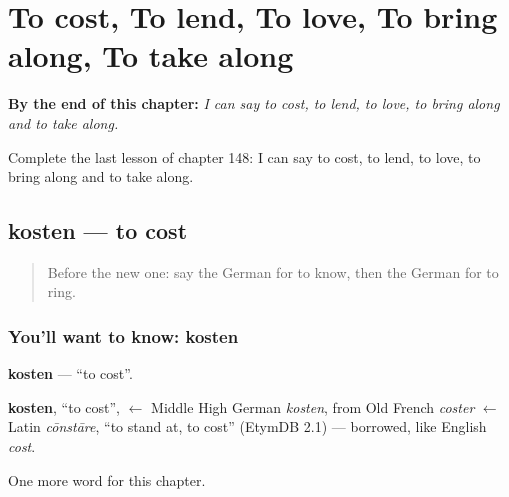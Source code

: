 
\chapter{To cost, To lend, To love, To bring along, To take along}
\label{ch:ge-to-cost-to-lend-to-love-to-bring-along-to-take-along}

\begin{chapteropening}
\textbf{By the end of this chapter:} \emph{I can say to cost, to lend, to love, to bring along and to take along.}

Complete the last lesson of chapter 148: I can say to cost, to lend, to love, to bring along and to take along.
\end{chapteropening}

\section[kosten]{kosten — to cost}

\label{lesson:GE-C148-kosten}



\begin{quote}
Before the new one: say the German for to know, then the German for to ring.
\end{quote}

\subsection*{You'll want to know: kosten}
\textbf{kosten} — \textquotedblleft{}to cost\textquotedblright{}.

\begin{cousinweb}
\textbf{kosten}, \textquotedblleft{}to cost\textquotedblright{}, $\leftarrow$ Middle High German \emph{kosten}, from Old French \emph{coster} $\leftarrow$ Latin \emph{cōnstāre}, \textquotedblleft{}to stand at, to cost\textquotedblright{} (EtymDB 2.1) — borrowed, like English \emph{cost}.
\end{cousinweb}

\begin{grammarlens}[title={What you've built}]
One more word for this chapter.
\end{grammarlens}

